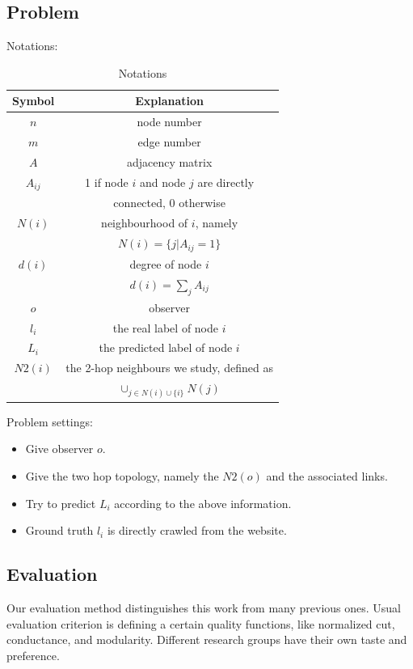 \documentclass[11pt,a4paper]{article}
\begin{document}
\subsection{Problem}
Notations:
\begin{table}[htb]
	\centering
	\caption{Notations}
	\label{tbl:notation}
	\begin{tabular}{c|c}
	\hline
	Symbol & Explanation \\
	\hline
	$n$ & node number \\
	\hline
	$m$ & edge number \\
	\hline
	$A$ & adjacency matrix \\
	\hline
	$A_{ij}$ & 1 if node $i$ and node $j$ are directly \\
	& connected, 0 otherwise\\
	\hline
	$N(i)$ & neighbourhood of $i$, namely \\
	& $N(i) = \{j | A_{ij} = 1 \}$ \\
	\hline
	$d(i)$ & degree of node $i$ \\
	& $d(i) = \sum_{j}{A_{ij}}$ \\
	\hline
	$o$ & observer \\
	\hline
	$l_i$ & the real label of node $i$ \\
	\hline
	$L_i$ & the predicted label of node $i$ \\
	\hline
	$N2(i)$ & the 2-hop neighbours we study, defined as \\
	& $\cup_{j \in N(i) \cup \{i\}}{N(j)}$\\
	\hline
	\end{tabular}
\end{table}

Problem settings:
\begin{itemize}
	\item Give observer $o$. 
	\item Give the two hop topology, namely the $N2(o)$ and 
	the associated links. 
	\item Try to predict $L_i$ according to the above information. 
	\item Ground truth $l_i$ is directly crawled from the website. 
\end{itemize}

\subsection{Evaluation}

Our evaluation method distinguishes this work from many 
previous ones. Usual evaluation criterion is defining 
a certain quality functions, like\cite{aggarwal2011social} normalized cut, 
conductance, and modularity. Different research groups 
have their own taste and preference. 
\end{document}
